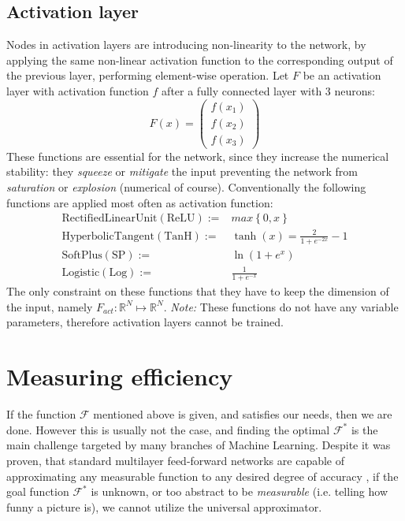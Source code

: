 \subsection{Activation layer} 
Nodes in activation layers are introducing non-linearity to the network, 
by applying the same non-linear activation function to the corresponding output of the previous layer, performing element-wise operation.
Let $F$ be an activation layer with activation function $f$ after a fully connected layer with 3 neurons:
\begin{equation*}
    F(x) = \begin{pmatrix}
    f(x_1) \\ 
    f(x_2) \\
    f(x_3)
    \end{pmatrix}
\end{equation*}
These functions are essential for the network, since they increase the numerical stability: they \emph{squeeze} or \emph{mitigate} the input preventing the network from \emph{saturation} or \emph{explosion} (numerical of course). Conventionally the following functions are applied most often as activation function:
\begin{align}
    \mathrm{Rectified Linear Unit (ReLU) := } &max\left\lbrace 0, x \right\rbrace \label{eq:af1} \\
    \mathrm{Hyperbolic Tangent (TanH) := }   &\tanh(x) = \frac{2}{1+e^{-2x}}-1 \label{eq:af2}\\
    \mathrm{SoftPlus (SP) := }   &\ln(1+e^x) \label{eq:af3}\\
    \mathrm{Logistic (Log) := }  &\frac{1}{1+e^{-x}} \label{eq:af4}
\end{align}
The only constraint on these functions that they have to keep the dimension of the input, namely $F_{act}:\mathbb{R}^N \mapsto \mathbb{R}^N$.
\emph{Note:} These functions do not have any variable parameters, therefore activation layers cannot be trained.

\section{Measuring efficiency}
If the function $\mathcal{F}$ mentioned above is given, and satisfies our needs, then we are done.
However this is usually not the case, and finding the optimal $\mathcal{F}^*$ is the main challenge targeted by many branches of Machine Learning.
Despite it was proven, that standard multilayer
feed-forward networks are capable of approximating
any measurable function to any desired degree of
accuracy \cite{hornik1989multilayer},
if the goal function $\mathcal{F}^*$ is unknown, 
or too abstract to be \emph{measurable} (i.e. telling how funny a picture is), 
we cannot utilize the universal approximator.

